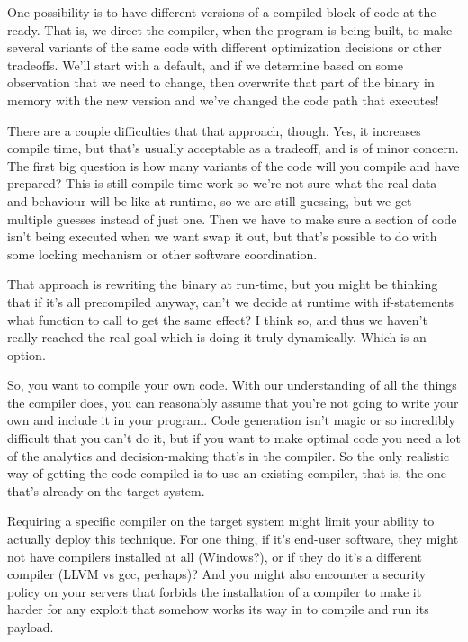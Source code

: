 One possibility is to have different versions of a compiled block of code at the ready. That is, we direct the compiler, when the program is being built, to make several variants of the same code with different optimization decisions or other tradeoffs. We'll start with a default, and if we determine based on some observation that we need to change, then overwrite that part of the binary in memory with the new version and we've changed the code path that executes!

There are a couple difficulties that that approach, though. Yes, it increases compile time, but that's usually acceptable as a tradeoff, and is of minor concern. The first big question is how many variants of the code will you compile and have prepared? This is still compile-time work so we're not sure what the real data and behaviour will be like at runtime, so we are still guessing, but we get multiple guesses instead of just one. Then we have to make sure a section of code isn't being executed when we want swap it out, but that's possible to do with some locking mechanism or other software coordination.

That approach is rewriting the binary at run-time, but you might be thinking that if it's all precompiled anyway, can't we decide at runtime with if-statements what function to call to get the same effect? I think so, and thus we haven't really reached the real goal which is doing it truly dynamically. Which is an option.

So, you want to compile your own code. With our understanding of all the things the compiler does, you can reasonably assume that you're not going to write your own and include it in your program. Code generation isn't magic or so incredibly difficult that you can't do it, but if you want to make optimal code you need a lot of the analytics and decision-making that's in the compiler. So the only realistic way of getting the code compiled is to use an existing compiler, that is, the one that's already on the target system.

Requiring a specific compiler on the target system might limit your ability to actually deploy this technique. For one thing, if it's end-user software, they might not have compilers installed at all (Windows?), or if they do it's a different compiler (LLVM vs gcc, perhaps)? And you might also encounter a security policy on your servers that forbids the installation of a compiler to make it harder for any exploit that somehow works its way in to compile and run its payload.

